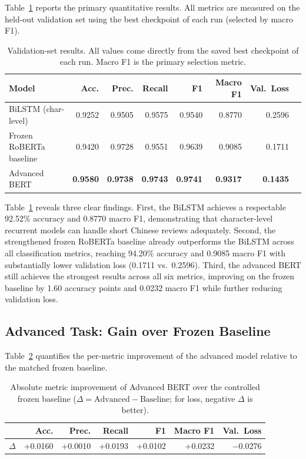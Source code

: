 \documentclass{article}
\begin{document}
Table~\ref{tab:results} reports the primary quantitative results.  All metrics
are measured on the held-out validation set using the best checkpoint of each
run (selected by macro F1).

\begin{table}[h]
  \centering
  \caption{Validation-set results.  All values come directly from the saved
    best checkpoint of each run.  Macro F1 is the primary selection metric.}
  \label{tab:results}
  \setlength{\tabcolsep}{6pt}
  \begin{tabular}{lrrrrrrr}
    \toprule
    Model & Acc. & Prec. & Recall & F1 & Macro F1 & Val.\ Loss \\
    \midrule
    BiLSTM (char-level)      & 0.9252 & 0.9505 & 0.9575 & 0.9540 & 0.8770 & 0.2596 \\
    Frozen RoBERTa baseline  & 0.9420 & 0.9728 & 0.9551 & 0.9639 & 0.9085 & 0.1711 \\
    Advanced BERT            & \textbf{0.9580} & \textbf{0.9738} & \textbf{0.9743}
                             & \textbf{0.9741} & \textbf{0.9317} & \textbf{0.1435} \\
    \bottomrule
  \end{tabular}
\end{table}

Table~\ref{tab:results} reveals three clear findings.  First, the BiLSTM
achieves a respectable 92.52\% accuracy and 0.8770 macro F1, demonstrating
that character-level recurrent models can handle short Chinese reviews
adequately.  Second, the strengthened frozen RoBERTa baseline already
outperforms the BiLSTM across all classification metrics, reaching 94.20\%
accuracy and 0.9085 macro F1 with substantially lower validation loss
(0.1711 vs.\ 0.2596).  Third, the advanced BERT still achieves the strongest
results across all six metrics, improving on the frozen baseline by 1.60
accuracy points and 0.0232 macro F1 while further reducing validation loss.

\subsection{Advanced Task: Gain over Frozen Baseline}

Table~\ref{tab:adv-delta} quantifies the per-metric improvement of the advanced
model relative to the matched frozen baseline.

\begin{table}[h]
  \centering
  \caption{Absolute metric improvement of Advanced BERT over the controlled
    frozen baseline ($\Delta = \text{Advanced} - \text{Baseline}$; for loss,
    negative $\Delta$ is better).}
  \label{tab:adv-delta}
  \setlength{\tabcolsep}{8pt}
  \begin{tabular}{lrrrrrr}
    \toprule
     & Acc. & Prec. & Recall & F1 & Macro F1 & Val.\ Loss \\
    \midrule
    $\Delta$ & +0.0160 & +0.0010 & +0.0193 & +0.0102 & +0.0232 & $-$0.0276 \\
    \bottomrule
  \end{tabular}
\end{table}
\end{document}
